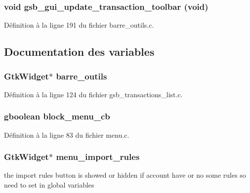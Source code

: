 \subsubsection[{gsb\_\-gui\_\-update\_\-transaction\_\-toolbar}]{\setlength{\rightskip}{0pt plus 5cm}void gsb\_\-gui\_\-update\_\-transaction\_\-toolbar (void)}\label{barre__outils_8c_ac0082a1048984a35739d37d106617dd6}


Définition à la ligne 191 du fichier barre\_\-outils.c.



\subsection{Documentation des variables}
\subsubsection[{barre\_\-outils}]{\setlength{\rightskip}{0pt plus 5cm}GtkWidget$\ast$ {\bf barre\_\-outils}}\label{barre__outils_8c_a268b1e31b413c512d03776ae10b8f785}


Définition à la ligne 124 du fichier gsb\_\-transactions\_\-list.c.

\subsubsection[{block\_\-menu\_\-cb}]{\setlength{\rightskip}{0pt plus 5cm}gboolean {\bf block\_\-menu\_\-cb}}\label{barre__outils_8c_a148929df9268caccbe39dfef840fe42d}


Définition à la ligne 83 du fichier menu.c.

\subsubsection[{menu\_\-import\_\-rules}]{\setlength{\rightskip}{0pt plus 5cm}GtkWidget$\ast$ {\bf menu\_\-import\_\-rules}}\label{barre__outils_8c_ae624b78f586a9e3f5d60e6f2e2866819}
the import rules button is showed or hidden if account have or no some rules so need to set in global variables 

